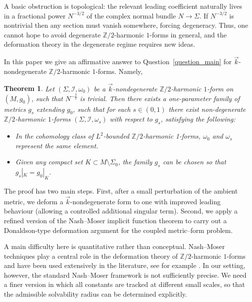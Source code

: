 \documentclass[11pt]{amsart}
\newcommand{\Z}{\mathbb{Z}}
\newtheorem{theorem}{Theorem}[section]
\begin{document}
A basic obstruction is topological: the relevant leading coefficient naturally lives in a fractional power \(N^{-3/2}\) of the complex normal bundle \(N\to \Sigma\). If \(N^{-3/2}\) is nontrivial then any section must vanish somewhere, forcing degeneracy.
Thus, one cannot hope to avoid degenerate \(\mathbb{Z}/2\)-harmonic \(1\)-forms in general, and the deformation theory in the degenerate regime requires new ideas. 

In this paper we give an affirmative answer to Question~\ref{question_main} for \(\vec{k}\)-nondegenerate \(\mathbb{Z}/2\)-harmonic \(1\)-forms. Namely,

\begin{theorem}\label{thm:k-degenerate-theorem}
	Let \((\Sigma,\mathcal{I},\omega_0)\) be a \(\vec{k}\)-nondegenerate \(\mathbb{Z}/2\)-harmonic \(1\)-form on \((M,g_0)\), such that $N^{-\frac{3}{2}}$ is trivial.
	Then there exists a one-parameter family of metrics \(g_s\) extending \(g_0\), such that for each \(s\in(0,1)\) there exist non-degenerate \(\mathbb{Z}/2\)-harmonic \(1\)-forms \((\Sigma,\mathcal{I},\omega_s)\) with respect to \(g_s\), satisfying the following:
	\begin{itemize}
		\item [(i)] In the cohomology class of $L^2$-bounded $\Z/2$-harmonic 1-forms, \(\omega_0\) and \(\omega_s\) represent the same element.

		\item [(ii)] Given any compact set \(K\subset M\setminus \Sigma_0\), the family \(g_s\) can be chosen so that \(g_s|_K=g_0|_K\).
	\end{itemize}
\end{theorem}

The proof has two main steps.
First, after a small perturbation of the ambient metric, we deform a \(\vec k\)-nondegenerate form to one with improved leading behaviour (allowing a controlled additional singular term).
Second, we apply a refined version of the Nash--Moser implicit function theorem to carry out a Donaldson-type deformation argument for the coupled metric--form problem.

A main difficulty here is quantitative rather than conceptual. Nash--Moser techniques play a central role in the deformation theory of \(\mathbb{Z}/2\)-harmonic \(1\)-forms and have been used extensively in the literature, see for example \cite{Donaldson2021,DonaldsonLehmann2024,Parker2026Deformations, Salm24}.
In our setting, however, the standard Nash--Moser framework is not sufficiently precise. We need a finer version in which all constants are tracked at different small scales, so that the admissible solvability radius can be determined explicitly.
\end{document}
